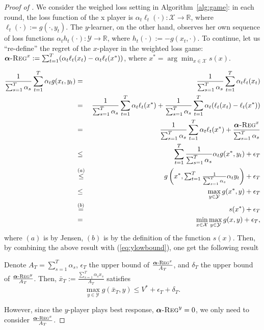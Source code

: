 \documentclass[pmlr]{jmlr} %
\def\reals{\mathbb{R}}
\def\reals{\mathbb{R}}
\def\balpha{\boldsymbol{\alpha}}
\newcommand{\regret}[1]{\balpha\textsc{-Reg}^{#1}}
\newcommand{\XX}{\mathcal{X}}
\newcommand{\YY}{\mathcal{Y}}
\begin{document}
\begin{proof}[Proof of ]


We consider the weighed loss setting in Algorithm~\ref{alg:game}:
in each round, the
loss function of the x player is $\alpha_{t} \ell_{t}(\cdot) : \XX \to \reals$, where $\ell_{t}(\cdot) := g(\cdot, y_{t})$. The $y$-learner, on the other hand, observes her own sequence of loss functions $\alpha_{t}  h_{t}(\cdot) : \YY \to \reals$, where $h_{t}(\cdot) := -  g(x_{t}, \cdot)$.
To continue, let us
``re-define'' the regret of the $x$-player in the weighted loss game:
$\regret{x}:= \sum_{t=1}^{T} ( \alpha_{t}  \ell_{t}(x_{t}) - \alpha_{t} \ell_{t}(x^{*}) )$, 
where
$x^{*} = \arg \min_{x \in \XX} s(x)$.

\begin{eqnarray}
\frac{1}{\sum_{s=1}^{T} \alpha_{s}}  \sum_{t=1}^{T}  \alpha_{t} g(x_{t}, y_{t}) & = & \frac{1}{\sum_{s=1}^{T} \alpha_{s}} \sum_{t=1}^{T}  \alpha_{t} \ell_{t}(x_{t}) \notag \\
  & = &  
\frac{1}{\sum_{s=1}^{T} \alpha_{s}} \sum_{t=1}^{T}  \alpha_{t} \ell_{t}(x^{*})
+ \frac{1}{\sum_{s=1}^{T} \alpha_{s}} \sum_{t=1}^{T}  \alpha_{t} ( \ell_{t}(x_{t}) - \ell_{t}(x^{*}) )
      \notag \\
  & = &  \frac{1}{\sum_{s=1}^{T} \alpha_{s}} \sum_{t=1}^{T}  \alpha_{t} \ell_{t}(x^{*}) + \frac{ \regret{x} }{  \sum_{s=1}^{T} \alpha_{s} }  \notag \\
  & \leq &  \sum_{t=1}^{T} \frac{1}{\sum_{s=1}^{T} \alpha_{s}} \alpha_{t} g(x^{*}, y_{t})  + \epsilon_{T} \notag \\
  & \overset{(a)}{\leq} & 
    g\left(x^{*},{ \textstyle \sum_{t=1}^{T} \frac{1}{\sum_{s=1}^{T} \alpha_{s}} \alpha_{t} y_{t}}\right) + \epsilon_{T} 
    \label{hi2} \\
  & \leq & 
    \max_{y \in \YY} g(x^{*},y)  + \epsilon_{T}    \\ 
  & \overset{(b)}{ = } & 
     s (x^{*})  + \epsilon_{T}    \\ 
  & = & \min_{x \in \XX} \max_{y \in \YY}   g(x,y) + \epsilon_{T} \notag,
\end{eqnarray}
where $(a)$ is by Jensen, $(b)$ is by the definition of the function $s(x)$.
Then, by combining the above result with (\ref{eq:ylowbound}), one get the following result 
\begin{proposition}
Denote $A_{T}=\sum_{s=1}^{T} \alpha_{s}$, $\epsilon_{T}$ the upper bound of 
$\frac{ \regret{x} }{ A_{T}}$, and $\delta_{T}$ the upper bound of 
$\frac{ \regret{y} }{ A_{T}}$.  Then,
$\bar{x}_{T} := \frac{ \sum_{s=1}^{T} \alpha_{s} x_{s}  }{ A_{T} }$ satisfies
\[  \max_{y \in \YY} g( \bar{x}_{T}, y)  \leq  V^{*} + \epsilon_{T} + \delta_{T}.\]
\end{proposition}
However, since the $y$-player plays best response, $\regret{y}=0$, we only need to consider
$\frac{ \regret{x} }{  A_{T} }$.


\end{proof}
\end{document}
